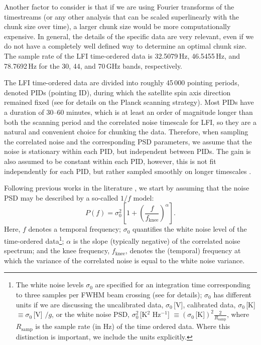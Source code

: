 \documentclass{aa}
\begin{document}
Another factor to consider is that if we are using Fourier transforms of the timestreams (or any other analysis that can be scaled superlinearly with the chunk size over time), a larger chunk size would be more computationally expensive. In general, the details of the specific data are very relevant, even if we do not have a completely well defined way to determine an optimal chunk size. The sample rate of the LFI time-ordered data is 32.5079\,Hz, 46.5455\,Hz, and 78.7692\,Hz for the 30, 44, and 70\,GHz bands, respectively.

The LFI time-ordered data are divided into roughly 45\,000 pointing
periods, denoted PIDs (pointing ID), during which the satellite spin 
axis direction remained fixed (see \citealt{planck2011-1.3} for details on the Planck scanning strategy). Most PIDs have a duration of
30--60 minutes, which is at least an order of magnitude longer than both the scanning period and the correlated noise timescale for LFI, so they are a natural and convenient choice for chunking the data. Therefore, when sampling the correlated noise and the corresponding PSD parameters, we assume that the noise is stationary within each PID, but independent between PIDs. The gain is also
assumed to be constant within each PID, however, this is not fit
independently for each PID, but rather sampled smoothly on longer
timescales \citep{bp07}.

Following previous works in the literature
\citep{mennella2010,planck2013-p02,planck2016-l02}, we start by assuming that the noise PSD may be described by a so-called $1/f$ model:
\begin{equation}
        P(f) = \sigma_0^2\left[1 +
          \left(\frac{f}{f_\mathrm{knee}}\right)^\alpha\right].
        \label{eq:1fmodel}
\end{equation} 
Here, $f$ denotes a temporal frequency; $\sigma_0$ quantifies the white
noise level of the time-ordered data\footnote{The white noise levels $\sigma_0$ are specified for an integration time corresponding to three samples per FWHM beam crossing (see \citet{maris2009a} for details); $\sigma_0$ has different units if we are discussing the uncalibrated data, $\sigma_0$\,[V], calibrated data, $\sigma_0$\,[K] $\equiv \sigma_0$\,[V] $/ g$, or the white noise PSD, $\sigma_0^2$\,[K${}^2$ Hz${}^{-1}$] $\equiv \left(\sigma_0\right.$\,[K]$\left. \right)^2 \frac{2}{R_\mathrm{samp}}$, where $R_\mathrm{samp}$ is the sample rate (in Hz) of the time ordered data. Where this distinction is important, we include the units explicitly.}; $\alpha$ is the slope (typically negative) of the correlated
noise spectrum; and the knee frequency, $f_\mathrm{knee}$, denotes the
(temporal) frequency at which the variance of the correlated noise is equal to the white noise variance. 
 
\end{document}
